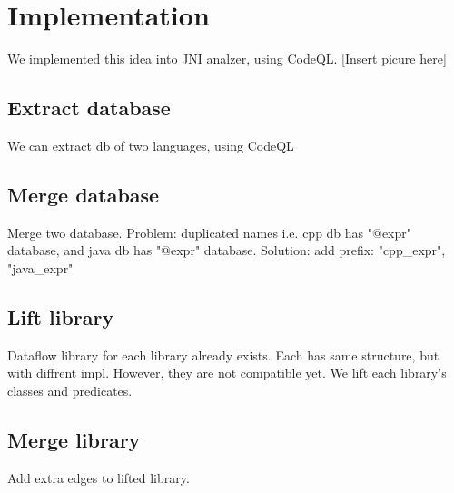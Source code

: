 \section{Implementation}
We implemented this idea into JNI analzer, using CodeQL.
[Insert picure here]

\subsection{Extract database}
We can extract db of two languages, using CodeQL

\subsection{Merge database}
Merge two database.
Problem: duplicated names
i.e. cpp db has "@expr" database, and java db has "@expr" database.
Solution: add prefix: "cpp\_expr", "java\_expr"

\subsection{Lift library}
Dataflow library for each library already exists.
Each has same structure, but with diffrent impl.
However, they are not compatible yet.
We lift each library's classes and predicates.

\subsection{Merge library}
Add extra edges to lifted library.
